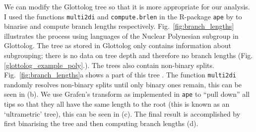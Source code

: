 \documentclass[a4paper,10pt]{article} %
\begin{document}
We can modify the Glottolog tree so that it is more appropriate for our analysis. I used the functions \texttt{multi2di} and \texttt{compute.brlen} in the R-package \texttt{ape} by \citet{paradis2004ape} to binarise and compute branch lengths respectively. Fig.~\ref{fig:branch_lengths} illustrates the process using languages of the Nuclear Polynesian subgroup in Glottolog. The tree as stored in Glottolog only contains information about subgrouping; there is no data on tree depth and therefore no branch lengths (Fig. \ref{glottolog_example_poly}.). The trees also contain non-binary splits. Fig.~\ref{fig:branch_lengths}a shows a part of this tree . The function \texttt{multi2di} randomly resolves non-binary splits until only binary ones remain, this can be seen in (b). We use Grafen's transform \citep{grafen1989phylogenetic} as implemented in \texttt{ape} to ``pull down'' all tips so that they all have the same length to the root (this is known as an `ultrametric' tree), this can be seen in (c). The final result is accomplished by first binarising the tree and then computing branch lengths (d). 
\end{document}
